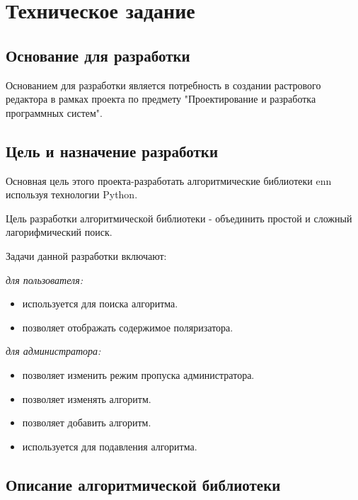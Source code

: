 \section{Техническое задание}
\subsection{Основание для разработки}

Основанием для разработки является потребность в создании растрового редактора в рамках проекта по предмету "Проектирование и разработка программных систем".

\subsection{Цель и назначение разработки}

Основная цель этого проекта-разработать алгоритмические библиотеки enn используя технологии Python.

Цель разработки алгоритмической библиотеки - объединить простой и сложный лагорифмический поиск.

Задачи данной разработки включают:

\emph{для пользователя:}
\begin{itemize}
	\item используется для поиска алгоритма.
	\item позволяет отображать содержимое поляризатора.
\end{itemize}
\emph{для администратора:}
\begin{itemize}
	\item позволяет изменить режим пропуска администратора.
	\item позволяет изменять алгоритм.
	\item позволяет добавить алгоритм.
	\item используется для подавления алгоритма.
\end{itemize}

\subsection{Описание алгоритмической библиотеки}

